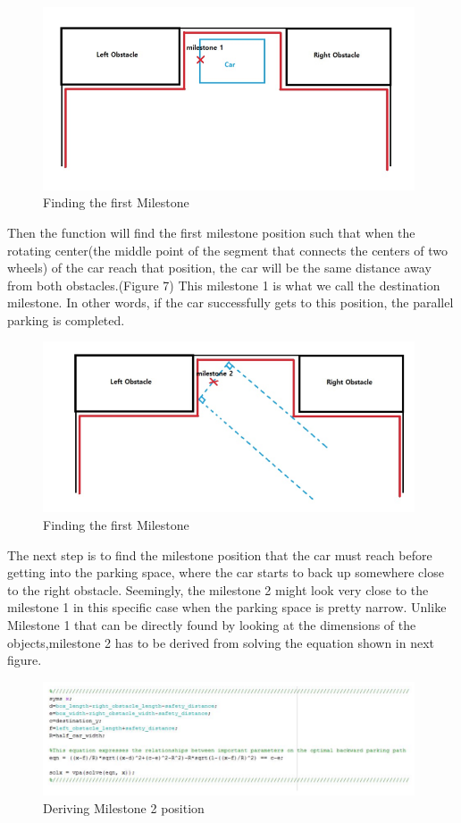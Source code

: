 \documentclass[12pt, letterpaper]{amsart} %
\numberwithin{equation}{section}
\begin{document}
\begin{figure}[h!]
\includegraphics[width=110mm]{fig_7.png}
\caption{Finding the first Milestone}
\label{fig:figure7}	
\end{figure}

Then the function will find the first milestone position such that when the rotating center(the middle point of the segment that connects the centers of two wheels) of the car reach that position, the car will be the same distance away from both obstacles.(Figure 7)
This milestone 1 is what we call the destination milestone. In other words, if the car successfully gets to this position, the parallel parking is completed.

\begin{figure}[h!]
\includegraphics[width=110mm]{fig_8.png}
\caption{Finding the first Milestone}
\label{fig:figure8}	
\end{figure}

The next step is to find the milestone position that the car must reach before getting into the parking space, where the car starts to back up somewhere close to the right obstacle.
Seemingly, the milestone 2 might look very close to the milestone 1 in this specific case when the parking space is pretty narrow. 
Unlike Milestone 1 that can be directly found by looking at the dimensions of the objects,milestone 2 has to be derived from solving the equation shown in next figure.
\newpage
\begin{figure}[h!]
\includegraphics[width=110mm]{fig_9.png}
\caption{Deriving Milestone 2 position}
\label{fig:figure9}	
\end{figure}
\end{document}
